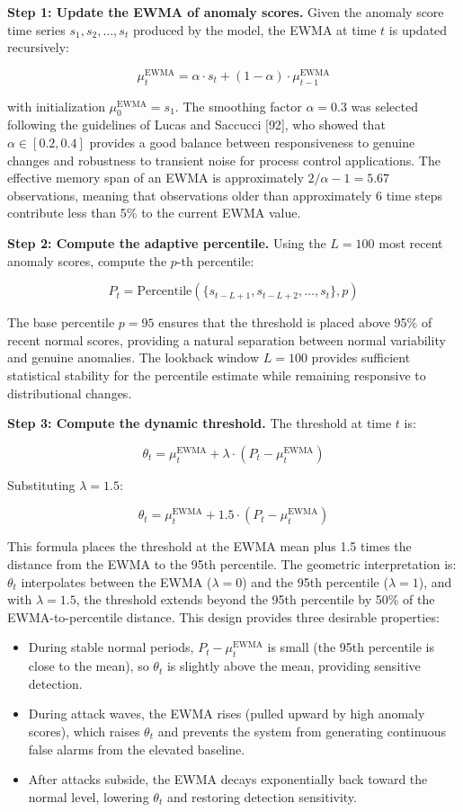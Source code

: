 \documentclass[
  a4paper]{report}
\providecommand{\tightlist}{%
  \setlength{\itemsep}{0pt}\setlength{\parskip}{0pt}}
\begin{document}
\textbf{Step 1: Update the EWMA of anomaly scores.} Given the anomaly
score time series \(s_1, s_2, \ldots, s_t\) produced by the model, the
EWMA at time \(t\) is updated recursively:

\[\mu_t^{\text{EWMA}} = \alpha \cdot s_t + (1 - \alpha) \cdot \mu_{t-1}^{\text{EWMA}}\]

with initialization \(\mu_0^{\text{EWMA}} = s_1\). The smoothing factor
\(\alpha = 0.3\) was selected following the guidelines of Lucas and
Saccucci {[}92{]}, who showed that \(\alpha \in [0.2, 0.4]\) provides a
good balance between responsiveness to genuine changes and robustness to
transient noise for process control applications. The effective memory
span of an EWMA is approximately \(2/\alpha - 1 = 5.67\) observations,
meaning that observations older than approximately 6 time steps
contribute less than 5\% to the current EWMA value.

\textbf{Step 2: Compute the adaptive percentile.} Using the \(L = 100\)
most recent anomaly scores, compute the \(p\)-th percentile:

\[P_t = \text{Percentile}(\{s_{t-L+1}, s_{t-L+2}, \ldots, s_t\}, p)\]

The base percentile \(p = 95\) ensures that the threshold is placed
above 95\% of recent normal scores, providing a natural separation
between normal variability and genuine anomalies. The lookback window
\(L = 100\) provides sufficient statistical stability for the percentile
estimate while remaining responsive to distributional changes.

\textbf{Step 3: Compute the dynamic threshold.} The threshold at time
\(t\) is:

\[\theta_t = \mu_t^{\text{EWMA}} + \lambda \cdot (P_t - \mu_t^{\text{EWMA}})\]

Substituting \(\lambda = 1.5\):

\[\theta_t = \mu_t^{\text{EWMA}} + 1.5 \cdot (P_t - \mu_t^{\text{EWMA}})\]

This formula places the threshold at the EWMA mean plus 1.5 times the
distance from the EWMA to the 95th percentile. The geometric
interpretation is: \(\theta_t\) interpolates between the EWMA
(\(\lambda = 0\)) and the 95th percentile (\(\lambda = 1\)), and with
\(\lambda = 1.5\), the threshold extends beyond the 95th percentile by
50\% of the EWMA-to-percentile distance. This design provides three
desirable properties:

\begin{itemize}
\tightlist
\item
  During stable normal periods, \(P_t - \mu_t^{\text{EWMA}}\) is small
  (the 95th percentile is close to the mean), so \(\theta_t\) is
  slightly above the mean, providing sensitive detection.
\item
  During attack waves, the EWMA rises (pulled upward by high anomaly
  scores), which raises \(\theta_t\) and prevents the system from
  generating continuous false alarms from the elevated baseline.
\item
  After attacks subside, the EWMA decays exponentially back toward the
  normal level, lowering \(\theta_t\) and restoring detection
  sensitivity.
\end{itemize}
\end{document}

